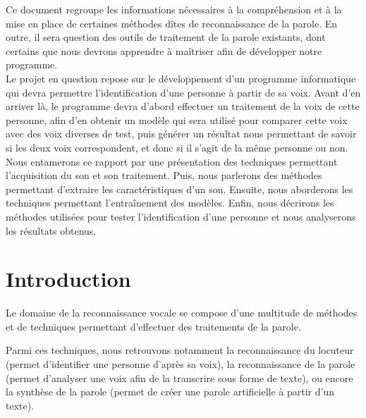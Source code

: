 \documentclass[a4paper, 12pt]{book}
\newcommand{\listofprograms}{\listof{programslist}{Liste des codes source}}
\newcounter{program}[subsection]
\begin{document}
Ce document regroupe les informations nécessaires à la compréhension et à la mise en place de certaines méthodes dîtes de reconnaissance de la parole. En outre, il sera question des outils de traitement de la parole existants, dont certains que nous devrons apprendre à maîtriser afin de développer notre programme.\\

Le projet en question repose sur le développement d'un programme informatique qui devra permettre l'identification d'une personne à partir de sa voix. Avant d'en arriver là, le programme devra d'abord effectuer un traitement de la voix de cette personne, afin d'en obtenir un modèle qui sera utilisé pour comparer cette voix avec des voix diverses de test, puis générer un résultat nous permettant de savoir si les deux voix correspondent, et donc si il s'agit de la même personne ou non.\\

Nous entamerons ce rapport par une présentation des techniques permettant l'acquisition du son et son traitement. Puis, nous parlerons des méthodes permettant d'extraire les caractéristiques d'un son. Ensuite, nous aborderons les techniques permettant l'entraînement des modèles. Enfin, nous décrirons les méthodes utilisées pour tester l'identification d'une personne et nous analyserons les résultats obtenus. 

\tableofcontents
\listoffigures
\mainmatter
\chapter*{Introduction}

Le domaine de la reconnaissance vocale se compose d'une multitude de méthodes et de techniques permettant d'effectuer des traitements de la parole. 

Parmi ces techniques, nous retrouvons notamment la reconnaissance du locuteur (permet d'identifier une personne d'après sa voix), la reconnaissance de la parole (permet d'analyser une voix afin de la transcrire sous forme de texte), ou encore la synthèse de la parole (permet de créer une parole artificielle à partir d'un texte).
\end{document}
